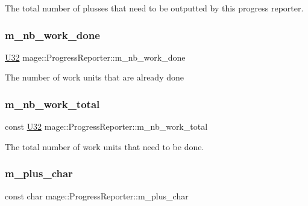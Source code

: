 The total number of plusses that need to be outputted by this progress reporter. \hypertarget{classmage_1_1_progress_reporter_a94bdbb09ae95976c72f1a8387ff96b70}{}\label{classmage_1_1_progress_reporter_a94bdbb09ae95976c72f1a8387ff96b70} 
\subsubsection{\texorpdfstring{m\+\_\+nb\+\_\+work\+\_\+done}{m\_nb\_work\_done}}
{\footnotesize\ttfamily \hyperlink{namespacemage_a41c104c036fba3756a74e19f793eeaa1}{U32} mage\+::\+Progress\+Reporter\+::m\+\_\+nb\+\_\+work\+\_\+done\hspace{0.3cm}{\ttfamily [private]}}

The number of work units that are already done \hypertarget{classmage_1_1_progress_reporter_a2da5863295669e3f6111f5508a4d30f7}{}\label{classmage_1_1_progress_reporter_a2da5863295669e3f6111f5508a4d30f7} 
\subsubsection{\texorpdfstring{m\+\_\+nb\+\_\+work\+\_\+total}{m\_nb\_work\_total}}
{\footnotesize\ttfamily const \hyperlink{namespacemage_a41c104c036fba3756a74e19f793eeaa1}{U32} mage\+::\+Progress\+Reporter\+::m\+\_\+nb\+\_\+work\+\_\+total\hspace{0.3cm}{\ttfamily [private]}}

The total number of work units that need to be done. \hypertarget{classmage_1_1_progress_reporter_ab3c8d12e79e63ae2b99fde8d6627c230}{}\label{classmage_1_1_progress_reporter_ab3c8d12e79e63ae2b99fde8d6627c230} 
\subsubsection{\texorpdfstring{m\+\_\+plus\+\_\+char}{m\_plus\_char}}
{\footnotesize\ttfamily const char mage\+::\+Progress\+Reporter\+::m\+\_\+plus\+\_\+char\hspace{0.3cm}{\ttfamily [private]}}

